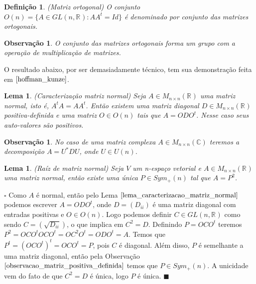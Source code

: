 \documentclass[12pt]{book}
\newtheorem{lema}[teorema]{Lema}
\newtheorem{definicao}[teorema]{Definição}
\newtheorem{observacao}[teorema]{Observação}
\newenvironment{prova}[1]{$\square$ #1}{\hfill$\blacksquare$}
\newcommand{\generalgroup}[2]{GL(#1, #2)}
\newcommand{\generalgroupreal}[1]{\generalgroup{#1}{\real{}}}
\newcommand{\matrizortogonal}[1]{O(#1)}
\newcommand{\matrizquadreal}[1]{M_{#1 \times #1}(\real{})}
\newcommand{\matrizsimetricapositiva}[1]{Sym_{+}(#1)}
\newcommand{\matrizunitaria}[1]{U(#1)}
\newcommand{\real}[1]{\mathbb{R}^{#1}}
\begin{document}
	\begin{definicao}
		(Matriz ortogonal) O conjunto $\matrizortogonal{n} =\{ A \in \generalgroupreal{n}: AA^{t}=Id \}$ é denominado por conjunto das matrizes ortogonais.
	\end{definicao}
	
	\begin{observacao}
		O conjunto das matrizes ortogonais forma um grupo com a operação de multiplicação de matrizes.
	\end{observacao}
	
	O resultado abaixo, por ser demasiadamente técnico, tem sua demonstração feita em $\cite{hoffman_kunze}$.
	
	\begin{lema}\label{lema_caracterizacao_matriz_normal}
		(Caracterização matriz normal) Seja $A\in \matrizquadreal{n}$ uma matriz normal, isto é, $A^{t}A=AA^{t}$. Então existem uma matriz diagonal $D \in \matrizquadreal{n}$ positiva-definida e uma matriz $O\in \matrizortogonal{n}$ tais que $A=ODO^{t}$. Nesse caso seus auto-valores são positivos. 
	\end{lema}
	
	\begin{observacao}\label{observacao_caracterizacao_matriz_normal}
		No caso de uma matriz complexa $A \in M_{n\times n}(\mathbb{C})$ teremos a decomposição $A=U^{*}DU$, onde $U \in \matrizunitaria{n}$.
	\end{observacao}
	
	\begin{lema}\label{lema_raiz_matriz_normal}
		(Raíz de matriz normal) Seja $V$ um n-espaço vetorial e $A\in \matrizquadreal{n}$ uma matriz normal, então existe uma única $P\in \matrizsimetricapositiva{n}$ tal que $A=P^{2}$. 
	\end{lema}
	\begin{prova}
		Como $A$ é normal, então pelo Lema $\ref{lema_caracterizacao_matriz_normal}$ podemos escrever $A=ODO^{t}$, onde $D=(D_{ii})$ é uma matriz diagonal com entradas positivas e $O\in \matrizortogonal{n}$. Logo podemos definir $C \in \generalgroupreal{n}$ como sendo $C = (\sqrt{D_{ii}})$, o que implica em $C^{2} = D$. Definindo $P = OCO^{t}$ teremos $P^{2} = OCO^{t}OCO^{t} = OC^{2}O^{t} = ODO^{t}=A$. Temos que $P^{t} = (OCO^{t})^{t} = OCO^{t} = P$, pois $C$ é diagonal. Além disso, $P$ é semelhante a uma matriz diagonal, então pela Observação $\ref{observacao_matriz_positiva_definida}$ temos que $P \in \matrizsimetricapositiva{n}$. A unicidade vem do fato de que $C^{2} = D$ é única, logo $P$ é única.
	\end{prova}
	
\end{document}
